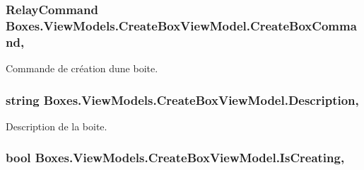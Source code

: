 \subsubsection[{\texorpdfstring{Create\+Box\+Command}{CreateBoxCommand}}]{\setlength{\rightskip}{0pt plus 5cm}Relay\+Command Boxes.\+View\+Models.\+Create\+Box\+View\+Model.\+Create\+Box\+Command\hspace{0.3cm}{\ttfamily [get]}, {}}\hypertarget{class_boxes_1_1_view_models_1_1_create_box_view_model_a1caece050f657d4dd780abe99c40c57f}{}\label{class_boxes_1_1_view_models_1_1_create_box_view_model_a1caece050f657d4dd780abe99c40c57f}


Commande de création d\textquotesingle{}une boite. 

\subsubsection[{\texorpdfstring{Description}{Description}}]{\setlength{\rightskip}{0pt plus 5cm}string Boxes.\+View\+Models.\+Create\+Box\+View\+Model.\+Description\hspace{0.3cm}{\ttfamily [get]}, {\ttfamily [set]}}\hypertarget{class_boxes_1_1_view_models_1_1_create_box_view_model_a695ac15cd94011bd2fc5f4922a8b26ba}{}\label{class_boxes_1_1_view_models_1_1_create_box_view_model_a695ac15cd94011bd2fc5f4922a8b26ba}


Description de la boite. 

\subsubsection[{\texorpdfstring{Is\+Creating}{IsCreating}}]{\setlength{\rightskip}{0pt plus 5cm}bool Boxes.\+View\+Models.\+Create\+Box\+View\+Model.\+Is\+Creating\hspace{0.3cm}{\ttfamily [get]}, {\ttfamily [set]}}\hypertarget{class_boxes_1_1_view_models_1_1_create_box_view_model_a75d0cdd9fba3f1884ddb3929ae417293}{}\label{class_boxes_1_1_view_models_1_1_create_box_view_model_a75d0cdd9fba3f1884ddb3929ae417293}


